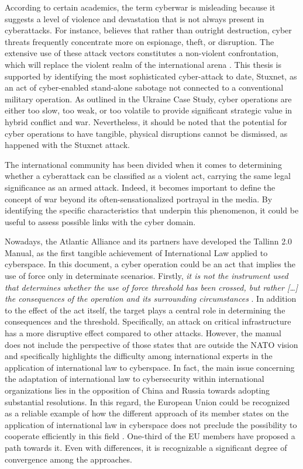 According to certain academics, the term cyberwar is misleading because it suggests a level of violence and devastation that is not always present in cyberattacks. For instance, \textcite{rid_2017_cyber} believes that rather than outright destruction, cyber threats frequently concentrate more on espionage, theft, or disruption. The extensive use of these attack vectors constitutes a non-violent confrontation, which will replace the violent realm of the international arena \autocite{rid_2017_cyber}. This thesis is supported by identifying the most sophisticated cyber-attack to date, Stuxnet, as an act of cyber-enabled stand-alone sabotage not connected to a conventional military operation. As \textcite{maschmeyer_2022_goodbye} outlined in the Ukraine Case Study, cyber operations are either too slow, too weak, or too volatile to provide significant strategic value in hybrid conflict and war. Nevertheless, it should be noted that the potential for cyber operations to have tangible, physical disruptions cannot be dismissed, as happened with the Stuxnet attack.

The international community has been divided when it comes to determining whether a cyberattack can be classified as a violent act, carrying the same legal significance as an armed attack. Indeed, it becomes important to define the concept of war beyond its often-sensationalized portrayal in the media. By identifying the specific characteristics that underpin this phenomenon, it could be useful to assess possible links with the cyber domain.

Nowadays, the Atlantic Alliance and its partners have developed the Tallinn 2.0 Manual, as the first tangible achievement of International Law applied to cyberspace. In this document, a cyber operation could be an act that implies the use of force only in determinate scenarios. Firstly, \textit{it is not the instrument used that determines whether the use of force threshold has been crossed, but rather […] the consequences of the operation and its surrounding circumstances} \autocite[328]{a2017_tallinn}. In addition to the effect of the act itself, the target plays a central role in determining the consequences and the threshold. Specifically, an attack on critical infrastructure has a more disruptive effect compared to other attacks.  However, the manual does not include the perspective of those states that are outside the NATO vision and specifically highlights the difficulty among international experts in the application of international law to cyberspace. In fact, the main issue concerning the adaptation of international law to cybersecurity within international organizations lies in the opposition of China and Russia towards adopting substantial resolutions. In this regard, the European Union could be recognized as a reliable example of how the different approach of its member states on the application of international law in cyberspace does not preclude the possibility to cooperate efficiently in this field \autocite{delerue_2023_toward}. One-third of the EU members have proposed a path towards it. Even with differences, it is recognizable a significant degree of convergence among the approaches. 


